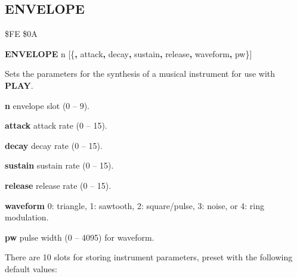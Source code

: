 \newpage
\subsection{ENVELOPE}
\begin{description}[leftmargin=2cm,style=nextline]
\item [Token:]    \$FE \$0A

\item [Format:]   {\bf ENVELOPE} n [\{{\bf,} attack{\bf,} decay{\bf,} sustain{\bf,} release{\bf,} waveform{\bf,} pw\}]

\item [Usage:]    Sets the parameters for the synthesis of a musical instrument for use with {\bf PLAY}.

                  {\bf n} envelope slot (0 -- 9).

                  {\bf attack} attack rate (0 -- 15).

                  {\bf decay} decay rate (0 -- 15).

                  {\bf sustain} sustain rate (0 -- 15).

                  {\bf release} release rate (0 -- 15).

                  {\bf waveform} 0: triangle, 1: sawtooth, 2: square/pulse, 3: noise, or 4: ring modulation.

                  {\bf pw} pulse width (0 -- 4095) for waveform.

                  \label{envelopetable}
                  There are 10 slots for storing instrument parameters, preset with the following default values:


\end{description}
